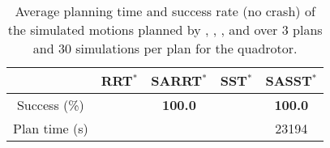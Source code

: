 \begin{table*}[t]
    \centering
    \begin{tabular}{l|llll|}
    \cline{2-5}
        & \multicolumn{1}{c|}{RRT$^{*}$} & \multicolumn{1}{c|}{SARRT$^*$} & \multicolumn{1}{c|}{SST$^*$} & \multicolumn{1}{c|}{SASST$^*$} \\ \hline
    \multicolumn{1}{|c|}{Success (\%)} & \multicolumn{1}{c|}{} & \multicolumn{1}{c|}{\textbf{100.0}}  & \multicolumn{1}{c|}{}  &  \multicolumn{1}{c|}{\textbf{100.0}}   \\ \hline
    \multicolumn{1}{|c|}{Plan time (s)} & \multicolumn{1}{c|}{}   & \multicolumn{1}{c|}{} & \multicolumn{1}{c|}{}  &   \multicolumn{1}{c|}{23194}  \\ \hline
    \end{tabular}
    \caption{
    \label{tab:samp_quad}
    Average planning time and success rate (no crash) of the simulated motions planned by , , , and  over 3 plans and 30 simulations per plan for the quadrotor.}
\end{table*}
